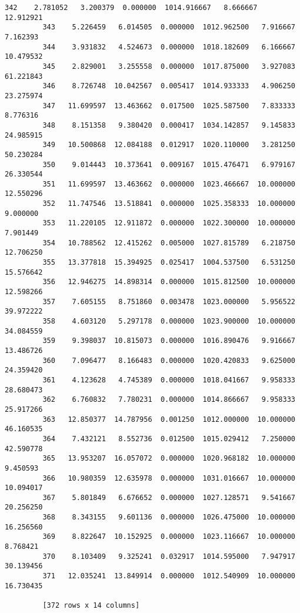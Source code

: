 \documentclass[11pt]{article}
\begin{document}
\begin{Verbatim}[commandchars=\\\{\}]
         342    2.781052   3.200379  0.000000  1014.916667   8.666667  12.912921  
         343    5.226459   6.014505  0.000000  1012.962500   7.916667   7.162393  
         344    3.931832   4.524673  0.000000  1018.182609   6.166667  10.479532  
         345    2.829001   3.255558  0.000000  1017.875000   3.927083  61.221843  
         346    8.726748  10.042567  0.005417  1014.933333   4.906250  23.275974  
         347   11.699597  13.463662  0.017500  1025.587500   7.833333   8.776316  
         348    8.151358   9.380420  0.000417  1034.142857   9.145833  24.985915  
         349   10.500868  12.084188  0.012917  1020.110000   3.281250  50.230284  
         350    9.014443  10.373641  0.009167  1015.476471   6.979167  26.330544  
         351   11.699597  13.463662  0.000000  1023.466667  10.000000  12.550296  
         352   11.747546  13.518841  0.000000  1025.358333  10.000000   9.000000  
         353   11.220105  12.911872  0.000000  1022.300000  10.000000   7.901449  
         354   10.788562  12.415262  0.005000  1027.815789   6.218750  12.706250  
         355   13.377818  15.394925  0.025417  1004.537500   6.531250  15.576642  
         356   12.946275  14.898314  0.000000  1015.812500  10.000000  12.598266  
         357    7.605155   8.751860  0.003478  1023.000000   5.956522  39.972222  
         358    4.603120   5.297178  0.000000  1023.900000  10.000000  34.084559  
         359    9.398037  10.815073  0.000000  1016.890476   9.916667  13.486726  
         360    7.096477   8.166483  0.000000  1020.420833   9.625000  24.359420  
         361    4.123628   4.745389  0.000000  1018.041667   9.958333  28.680473  
         362    6.760832   7.780231  0.000000  1014.866667   9.958333  25.917266  
         363   12.850377  14.787956  0.001250  1012.000000  10.000000  46.160535  
         364    7.432121   8.552736  0.012500  1015.029412   7.250000  42.590778  
         365   13.953207  16.057072  0.000000  1020.968182  10.000000   9.450593  
         366   10.980359  12.635978  0.000000  1031.016667  10.000000  10.094017  
         367    5.801849   6.676652  0.000000  1027.128571   9.541667  20.256250  
         368    8.343155   9.601136  0.000000  1026.475000  10.000000  16.256560  
         369    8.822647  10.152925  0.000000  1023.116667  10.000000   8.768421  
         370    8.103409   9.325241  0.032917  1014.595000   7.947917  30.139456  
         371   12.035241  13.849914  0.000000  1012.540909  10.000000  16.730435  
         
         [372 rows x 14 columns]
\end{Verbatim}
            
\end{document}

